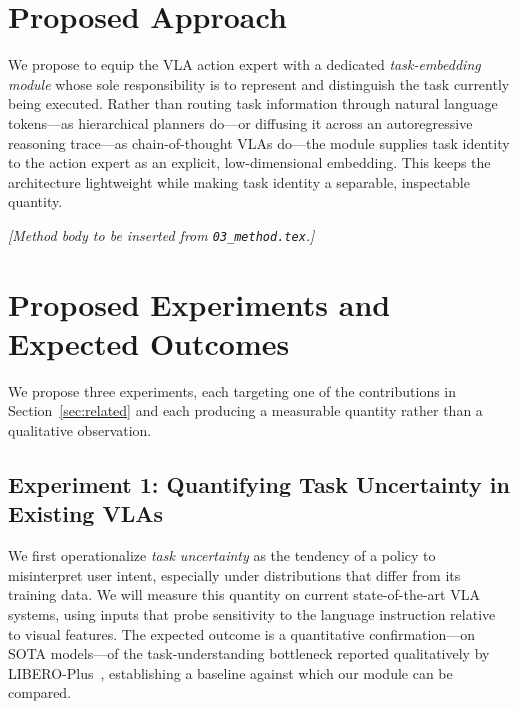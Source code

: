 \documentclass[11pt]{article}
\begin{document}
\section{Proposed Approach}
\label{sec:method}

We propose to equip the VLA action expert with a dedicated \emph{task-embedding module} whose sole responsibility is to represent and distinguish the task currently being executed. Rather than routing task information through natural language tokens---as hierarchical planners do---or diffusing it across an autoregressive reasoning trace---as chain-of-thought VLAs do---the module supplies task identity to the action expert as an explicit, low-dimensional embedding. This keeps the architecture lightweight while making task identity a separable, inspectable quantity.


\medskip
\noindent\textit{[Method body to be inserted from \texttt{03\_method.tex}.]}

\section{Proposed Experiments and Expected Outcomes}
\label{sec:experiments}

We propose three experiments, each targeting one of the contributions in Section~\ref{sec:related} and each producing a measurable quantity rather than a qualitative observation.

\subsection{Experiment 1: Quantifying Task Uncertainty in Existing VLAs}

We first operationalize \emph{task uncertainty} as the tendency of a policy to misinterpret user intent, especially under distributions that differ from its training data. We will measure this quantity on current state-of-the-art VLA systems, using inputs that probe sensitivity to the language instruction relative to visual features. The expected outcome is a quantitative confirmation---on SOTA models---of the task-understanding bottleneck reported qualitatively by LIBERO-Plus~\cite{liberoplus}, establishing a baseline against which our module can be compared.
\end{document}

